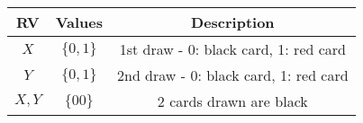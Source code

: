 
\begin{center}
\begin{tabular}{|c|c|c|}
\hline
\textbf{RV}& \textbf{Values} & \textbf{Description} \\ \hline
$X$		   & 	$\{0,1\}$	&  1st draw - 0: black card, 1: red card\\ \hline
$Y$ 		   & 	$\{0,1\}$	&  2nd draw - 0: black card, 1: red card\\ \hline
$X,Y$ 		   & 	$\{00\}$	&	2 cards drawn are black\\ \hline
\end{tabular}
\end{center}
